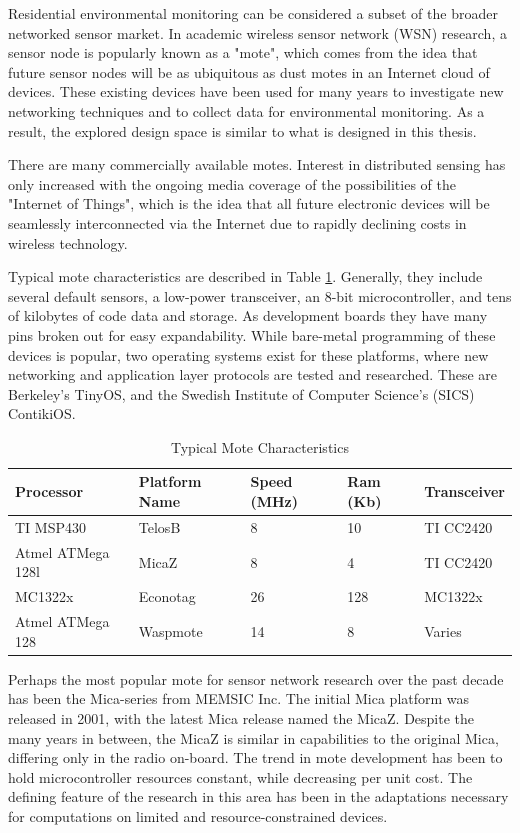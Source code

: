 Residential environmental monitoring can be considered a subset of the broader networked sensor market. In academic wireless sensor network (WSN) research, a sensor node is popularly known as a "mote", which comes from the idea that future sensor nodes will be as ubiquitous as dust motes in an Internet cloud of devices. These existing devices have been used for many years to investigate new networking techniques and to collect data for environmental monitoring. As a result, the explored design space is similar to what is designed in this thesis. 

There are many commercially available motes. Interest in distributed sensing has only increased with the ongoing media coverage of the possibilities of the "Internet of Things", which is the idea that all future electronic devices will be seamlessly interconnected via the Internet due to rapidly declining costs in wireless technology. 

Typical mote characteristics are described in Table \ref{mote_characteristics}. Generally, they include several default sensors, a low-power transceiver, an 8-bit microcontroller, and tens of kilobytes of code data and storage. As development boards they have many pins broken out for easy expandability. While bare-metal programming of these devices is popular, two operating systems exist for these platforms, where new networking and application layer protocols are tested and researched. These are Berkeley's TinyOS, and the Swedish Institute of Computer Science's (SICS) ContikiOS. 

\begin{table}[h]
\begin{tabular}{@{}lllll@{}}
\toprule
Processor & Platform Name & Speed (MHz) & Ram (Kb) & Transceiver \\ \midrule
TI MSP430 & TelosB & 8 & 10 & TI CC2420 \\
Atmel ATMega 128l & MicaZ & 8 & 4 & TI CC2420 \\
MC1322x & Econotag & 26 & 128 & MC1322x \\
Atmel ATMega 128 & Waspmote & 14 & 8 & Varies \\ \bottomrule
\end{tabular}
\caption{Typical Mote Characteristics}
\label{mote_characteristics}
\end{table}

Perhaps the most popular mote for sensor network research over the past decade has been the Mica-series from MEMSIC Inc. The initial Mica platform was released in 2001\cite{hill2002mica}, with the latest Mica release named the MicaZ. Despite the many years in between, the MicaZ is similar in capabilities to the original Mica, differing only in the radio on-board. The trend in mote development has been to hold microcontroller resources constant, while decreasing per unit cost. The defining feature of the research in this area has been in the adaptations necessary for computations on limited and resource-constrained devices. 

